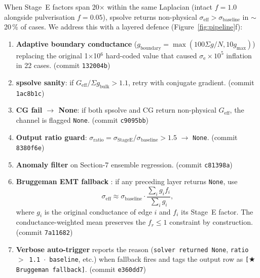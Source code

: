 \documentclass[11pt, a4paper]{article}
\begin{document}
When Stage~E factors span 20$\times$ within the same Laplacian
(intact $f = 1.0$ alongside pulverisation $f = 0.05$), spsolve
returns non-physical $\sigma_{\mathrm{eff}} > \sigma_{\mathrm{baseline}}$
in $\sim$20\,\% of cases. We address this with a layered defence
(Figure~\ref{fig:pipeline}f):

\begin{enumerate}
\item[\textbf{L1.}] \textbf{Adaptive boundary conductance}
      ($g_{\mathrm{boundary}} = \max(100\Sigma g/N, 10 g_{\max})$)
      replacing the original 1$\times$10$^{6}$ hard-coded value
      that caused $\sigma_{\mathrm{e}} \times 10^5$ inflation in
      22 cases. (commit \texttt{132004b})
\item[\textbf{L2.}] \textbf{spsolve sanity}: if $G_{\mathrm{eff}} /
      \Sigma g_{\mathrm{bulk}} > 1.1$, retry with conjugate gradient.
      (commit \texttt{1ac8b1c})
\item[\textbf{L3.}] \textbf{CG fail $\to$ None}: if both spsolve and
      CG return non-physical $G_{\mathrm{eff}}$, the channel is
      flagged \texttt{None}. (commit \texttt{c9095bb})
\item[\textbf{L4.}] \textbf{Output ratio guard}: $\sigma_{\mathrm{ratio}}
      = \sigma_{\mathrm{Stage E}} / \sigma_{\mathrm{baseline}} > 1.5$
      $\to$ \texttt{None}. (commit \texttt{8380f6e})
\item[\textbf{L5.}] \textbf{Anomaly filter} on Section-7 ensemble
      regression. (commit \texttt{c81398a})
\item[\textbf{L6.}] \textbf{Bruggeman EMT fallback}
      \citep{Bruggeman1935}: if any preceding layer returns
      \texttt{None}, use
      \begin{equation}
        \sigma_{\mathrm{eff}}
        \approx \sigma_{\mathrm{baseline}}
                \cdot \frac{\sum_i g_i f_i}{\sum_i g_i},
      \label{eq:bruggeman}
      \end{equation}
      where $g_i$ is the original conductance of edge $i$ and $f_i$
      its Stage~E factor. The conductance-weighted mean preserves
      the $f_r \le 1$ constraint by construction. (commit \texttt{7a11682})
\item[\textbf{L7.}] \textbf{Verbose auto-trigger} reports the
      reason (\texttt{solver returned None}, \texttt{ratio $>$ 1.1
      $\cdot$ baseline}, etc.) when fallback fires and tags the
      output row as \texttt{[$\bigstar$Bruggeman fallback]}.
      (commit \texttt{e360dd7})
\end{enumerate}
\end{document}
